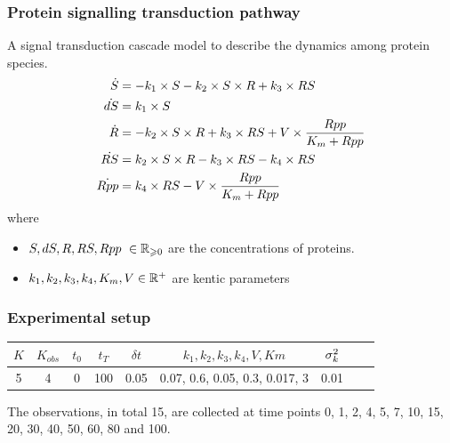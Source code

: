 \begin{frame}[t]
    \frametitle{Protein signalling transduction pathway}
    A signal transduction cascade model to describe the dynamics among protein species.
    \begin{align}
        \dot{S} 
        & = 
        -k_{1} \times S 
        -k_{2} \times S \times R
        + k_{3} \times RS
        \nonumber
        \\
        \dot{dS}
        & = 
        k_{1} \times S    
        \nonumber
        \\
        \dot{R}
        & =
        -k_{2} \times S \times R 
        + k_{3} \times RS
        + V \times \frac{Rpp}{K_{m} + Rpp}
        \nonumber
        \\
        \dot{RS}
        & =
        k_{2} \times S \times R
        - k_{3} \times RS
        - k_{4} \times RS
        \nonumber
        \\
        \dot{Rpp} 
        & =
        k_{4} \times RS - V \times \frac{Rpp}{K_{m} + Rpp}
    \end{align}
    where 
    \begin{itemize}
        \item[] $S, dS, R, RS, Rpp \ \in \mathbb{R}_{\geqslant 0}$ are the concentrations of proteins. 
        \item[] $k_{1}, k_{2}, k_{3}, k_{4}, K_{m}, V \in \mathbb{R}^+$ are kentic parameters
    \end{itemize}
\end{frame}

\begin{frame}[t]
    \frametitle{Experimental setup}
    \begin{table}
    \centering
    \label{table-protein-setup}
    \begin{tabular}{|c|c|c|c|c|c|c|c|c|}
    \hline
    $K$ & $K_{obs}$ & $t_0$ & $t_T$ & $\delta t$ & $k_1, k_2, k_3, k_4, V, Km$ & $\sigma_{k}^2$ \\ \hline
    5 & 4 & 0 & 100 & 0.05 & 0.07, 0.6, 0.05, 0.3, 0.017, 3 & 0.01\\ \hline
    \end{tabular}
    \end{table}    
    
    \vspace{\baselineskip}
    The observations, in total 15, are collected at time points 0, 1, 2, 4, 5, 7, 10, 15, 20, 30, 40, 50, 60, 80 and 100.
\end{frame}

